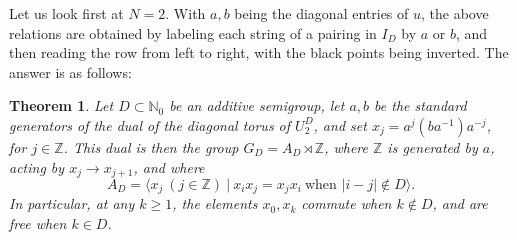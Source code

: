 \documentclass[11pt,a4paper]{article}
\newtheorem{thm}{Theorem}[section]
\begin{document}
Let us look first at $N=2$. With $a,b$ being the diagonal entries of $u$, the above relations are obtained by labeling each string of a pairing in $I_D$ by $a$ or $b$, and then reading the row from left to right, with the black points being inverted. The answer is as follows:

\begin{thm}\label{torus}
Let $D\subset\mathbb N_0$ be an additive semigroup, let $a,b$ be the standard generators of the dual of the diagonal torus of $U_2^D$, and set $x_j=a^j(ba^{-1})a^{-j}$, for $j\in\mathbb Z$. This dual is then the group $G_D=A_D\rtimes\mathbb Z$, where $\mathbb Z$ is generated by $a$, acting by $x_j\to x_{j+1}$, and where
\[
 A_D=\Big\langle x_j\ (j\in\mathbb Z)\ \Big|\ x_ix_j=x_jx_i\ \text{when } |i-j|\notin D\Big\rangle .
\]
In particular, at any $k\geq1$, the elements $x_0,x_k$ commute when $k\notin D$, and are free when $k\in D$.
\end{thm}
\end{document}
